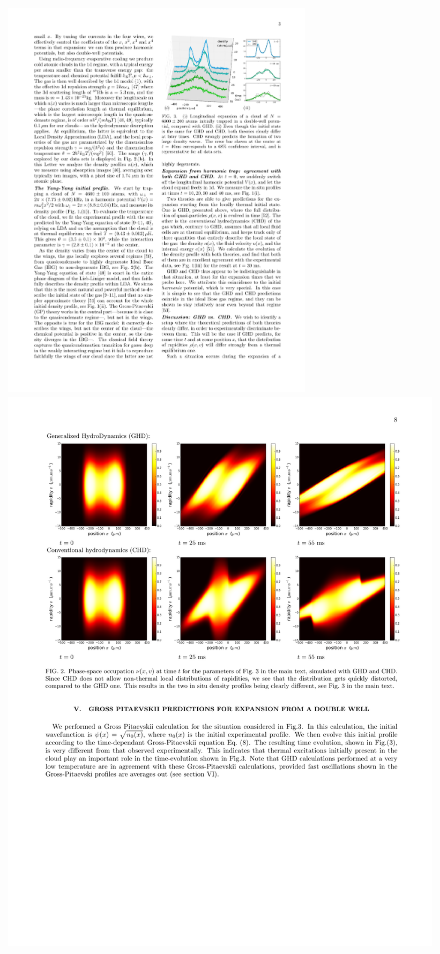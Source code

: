 \documentclass[onecolumn,amsfonts,showpacs,superscriptaddress]{revtex4-1}
\begin{document}
\begin{figure}[ht]
    \centering
    \includegraphics[viewport=306 578 567 745,clip,width=0.7\textwidth]{figures/GHDSchemmer_p3.pdf} \\ \vspace{0.4cm}
    \includegraphics[width=\textwidth,viewport=34 406 568 730,clip,width=0.7\textwidth]{figures/rhokv_quenchdoublewell.pdf}

\end{figure}
\end{document}
